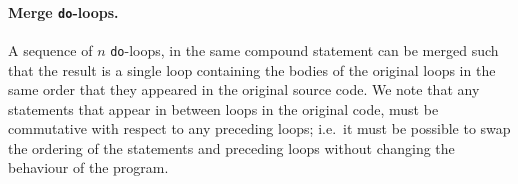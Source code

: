 %


\paragraph{Merge \lstinline{do}-loops.}

A sequence of $n$ \lstinline{do}-loops,
%
%
%
in the same compound statement can be merged such that the result is a single loop containing the bodies of the original loops in the same order that they appeared in the original source code. We note that any statements that appear in between loops in the original code, must be commutative with respect to any preceding loops; i.e.\ it must be possible to swap the ordering of the statements and preceding loops without changing the behaviour of the program.

